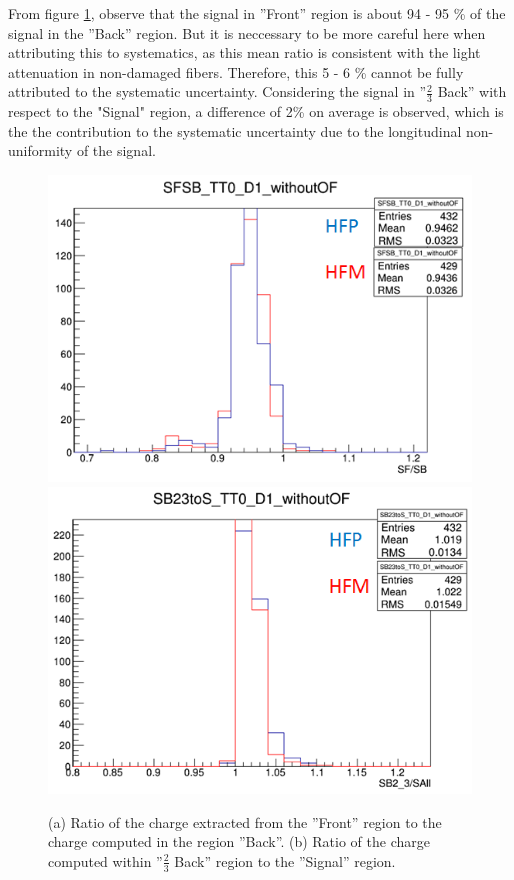 From figure \ref{fig:HF_LongUni}, observe that the signal in ''Front'' region is about 94 - 95 \% of the signal in the ''Back'' region. But it is neccessary to be more careful here when attributing this to systematics, as this mean ratio is consistent with the light attenuation in non-damaged fibers. Therefore, this 5 - 6 \% cannot be fully attributed to the systematic uncertainty. Considering the signal in ''$\frac{2}{3}$ Back'' with respect to the "Signal" region, a difference of 2\% on average is observed, which is the the contribution to the systematic uncertainty due to the longitudinal non-uniformity of the signal.
\begin{figure}[htb]
    \centering
    \includegraphics[width=.45\textwidth]{figures/ch_hfcalibration/SFSB_D1_woOF.png}
    \includegraphics[width=.45\textwidth]{figures/ch_hfcalibration/SB23toS_D1_woOF.png}
    \caption{(a) Ratio of the charge extracted from the ''Front'' region to the charge computed in the region ''Back''. (b) Ratio of the charge computed within ''$\frac{2}{3}$ Back'' region to the ''Signal'' region. }
    \label{fig:HF_LongUni}
\end{figure}


